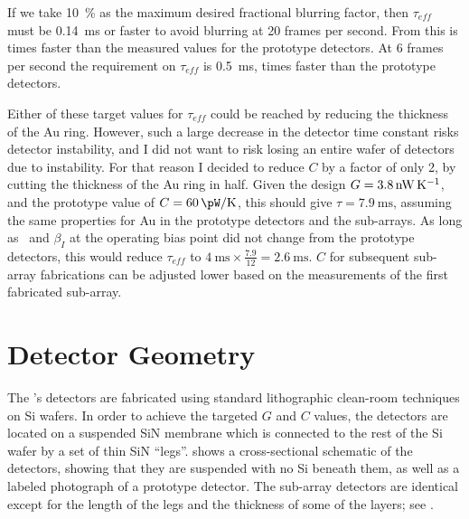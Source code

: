 If we take \SI{10}{\percent} as the maximum desired fractional blurring factor, then $\tau_{eff}$ must be \SI{0.14}{\ms} or faster to avoid blurring at 20 frames per second.
From  this is  times faster than the measured values for the prototype detectors.
At 6 frames per second the requirement on $\tau_{eff}$ is \SI{0.5}{\ms},  times faster than the prototype detectors.

Either of these target values for $\tau_{eff}$ could be reached by reducing the thickness of the Au ring.
However, such a large decrease in the detector time constant risks detector instability, and I did not want to risk losing an entire wafer of detectors due to instability.
For that reason I decided to reduce $C$ by a factor of only 2, by cutting the thickness of the Au ring in half.
Given the design $G = \SI{3.8}{\nW\per\K}$, and the prototype value of $C = \SI{60}{\pW\per\K}$, this should give $\tau = \SI{7.9}{\ms}$, assuming the same properties for Au in the prototype detectors and the sub-arrays. 
As long as \Loop\ and $\beta_I$ at the operating bias point did not change from the prototype detectors, this would reduce $\tau_{eff}$ to $\SI{4}{\ms} \times \frac{7.9}{12} = \SI{2.6}{\ms}$.
$C$ for subsequent sub-array fabrications can be adjusted lower based on the measurements of the first fabricated sub-array.

\section{Detector Geometry} \label{sec:ch5-det-design}

The \Imager's detectors are fabricated using standard lithographic clean-room techniques on Si wafers.
In order to achieve the targeted $G$ and $C$ values, the detectors are located on a suspended SiN membrane which is connected to the rest of the Si wafer by a set of thin SiN ``legs''.
 shows a cross-sectional schematic of the detectors, showing that they are suspended with no Si beneath them, as well as a labeled photograph of a prototype detector.
The sub-array detectors are identical except for the length of the legs and the thickness of some of the layers; see .

